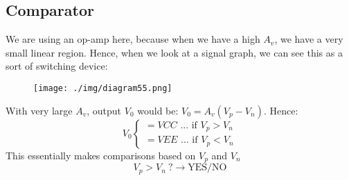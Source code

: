 \subsection{Comparator}
We are using an op-amp here, because when we have a high $A_v$, we have a very small linear region. Hence, when we look at a signal graph, we can see this as a sort of switching device:
\begin{figure}[H]
  \centering
  \texttt{[image: ./img/diagram55.png]}
\end{figure}
With very large $A_v$, output $V_0$ would be: $V_0 = A_v (V_p - V_n)$. Hence:
\begin{equation}
  V_0 \begin{cases}
    = VCC \textrm{ ... if } V_p > V_n \\
    = VEE \textrm{ ... if } V_p < V_n
  \end{cases}
\end{equation}
This essentially makes comparisons based on $V_p$ and $V_n$
\begin{equation}
  V_p > V_n \ ? \rightarrow \textrm{YES/NO}
\end{equation}

